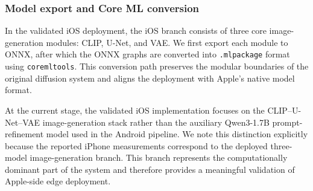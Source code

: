 \subsubsection{Model export and Core ML conversion}

In the validated iOS deployment, the iOS branch consists of three core image-generation modules: CLIP, U-Net, and VAE. We first export each module to ONNX, after which the ONNX graphs are converted into \texttt{.mlpackage} format using \texttt{coremltools}. This conversion path preserves the modular boundaries of the original diffusion system and aligns the deployment with Apple’s native model format.

At the current stage, the validated iOS implementation focuses on the CLIP--U-Net--VAE image-generation stack rather than the auxiliary Qwen3-1.7B prompt-refinement model used in the Android pipeline. We note this distinction explicitly because the reported iPhone measurements correspond to the deployed three-model image-generation branch. This branch represents the computationally dominant part of the system and therefore provides a meaningful validation of Apple-side edge deployment.

